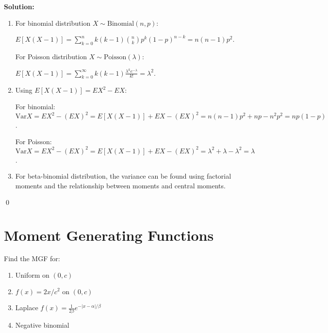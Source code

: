 \noindent\textbf{Solution:}
\begin{enumerate}[label=(\alph*)]
    \item For binomial distribution $X \sim \text{Binomial}(n,p)$:
    
    $E[X(X-1)] = \sum_{k=0}^n k(k-1)\binom{n}{k}p^k(1-p)^{n-k} = n(n-1)p^2$.
    
    For Poisson distribution $X \sim \text{Poisson}(\lambda)$:
    
    $E[X(X-1)] = \sum_{k=0}^\infty k(k-1)\frac{\lambda^k e^{-\lambda}}{k!} = \lambda^2$.
    
    \item Using $E[X(X-1)] = EX^2 - EX$:
    
    For binomial: $\text{Var}X = EX^2 - (EX)^2 = E[X(X-1)] + EX - (EX)^2 = n(n-1)p^2 + np - n^2p^2 = np(1-p)$.
    
    For Poisson: $\text{Var}X = EX^2 - (EX)^2 = E[X(X-1)] + EX - (EX)^2 = \lambda^2 + \lambda - \lambda^2 = \lambda$.
    
    \item For beta-binomial distribution, the variance can be found using factorial moments and the relationship between moments and central moments.
\end{enumerate}


\qed
\section{Moment Generating Functions}

\begin{problembox}
Find the MGF for:
\begin{enumerate}[label=(\alph*)]
    \item Uniform on $(0,c)$
    \item $f(x)=2x/c^2$ on $(0,c)$
    \item Laplace $f(x)=\frac{1}{2\beta}e^{-|x-\alpha|/\beta}$
    \item Negative binomial
\end{enumerate}
\end{problembox}

